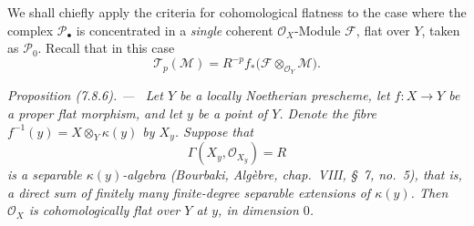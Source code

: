\documentclass[10pt,oneside]{book}
\newcommand{\sh}[1]{\mathscr{#1}}
\newcommand{\kres}{\kappa}
\newenvironment{proposition}[1][]{\par\medskip\noindent\itshape Proposition (#1). ---\ }{\par}
\begin{document}
We shall chiefly apply the criteria for cohomological
flatness to the case where the complex $\sh{P}_\bullet$ is
concentrated in a \emph{single} coherent
$\sh{O}_X$-Module $\sh{F}$, flat over $Y$, taken as
$\sh{P}_0$.  Recall that in this case
\[
  \sh{T}_p(\sh{M})
  =R^{-p}f_*
    \bigl(\sh{F}\otimes_{\sh{O}_Y}\sh{M}\bigr).
\]

\begin{proposition}[7.8.6]
\label{III.7.8.6}
Let $Y$ be a locally Noetherian prescheme, let
$f:X\to Y$ be a proper flat morphism, and let $y$ be a point
of $Y$.  Denote the fibre
$f^{-1}(y)=X\otimes_Y\kres(y)$ by $X_y$.  Suppose that
\[
  \Gamma(X_y,\sh{O}_{X_y})=R
\]
is a separable $\kres(y)$-algebra (Bourbaki,
\emph{Alg\`ebre}, chap.~VIII, \S~7, no.~5), that is, a
direct sum of finitely many finite-degree separable
extensions of $\kres(y)$.  Then $\sh{O}_X$ is
cohomologically flat over $Y$ at $y$, in dimension $0$.
\end{proposition}
\end{document}
